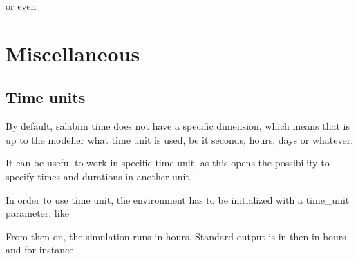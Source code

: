 \documentclass[letterpaper,10pt,english]{sphinxmanual}
\begin{document}
or even

\begin{sphinxVerbatim}[commandchars=\\\{\}]
\end{sphinxVerbatim}


\chapter{Miscellaneous}
\label{\detokenize{Miscellaneous:miscellaneous}}\label{\detokenize{Miscellaneous::doc}}

\section{Time units}
\label{\detokenize{Miscellaneous:time-units}}
By default, salabim time does not have a specific dimension, which means that is up to
the modeller what time unit is used, be it seconds, hours, days or whatever.

It can be useful to work in specific time unit, as this opens the possibility to specify times and durations in another unit.

In order to use time unit, the environment has to be initialized with a time\_unit parameter, like

\begin{sphinxVerbatim}[commandchars=\\\{\}]
  
\end{sphinxVerbatim}

From then on, the simulation runs in hours. Standard output is in then in hours and for instance

\begin{sphinxVerbatim}[commandchars=\\\{\}]
 
  
\end{sphinxVerbatim}
\end{document}
